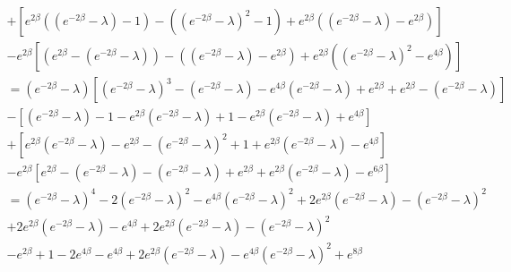 \documentclass[fleqn]{article}
\begin{document}
\begin{eqnarray}
 + \left[ e^{2 \beta} \left( (e^{-2 \beta} - \lambda) - 1 \right) - \left( (e^{-2 \beta} - \lambda)^2 -1 \right) + e^{2 \beta} \left( (e^{-2 \beta} - \lambda) - e^{2 \beta} \right) \right] \\
- e^{2 \beta} \left[ \left( e^{2 \beta} - (e^{-2 \beta} - \lambda) \right) - \left( (e^{-2 \beta} - \lambda) - e^{2 \beta} \right) + e^{2 \beta} \left( (e^{-2 \beta} - \lambda)^2 - e^{4 \beta} \right) \right] \\
= (e^{-2 \beta} - \lambda) \left[ (e^{-2 \beta} - \lambda)^3 - (e^{-2 \beta} - \lambda) - e^{4 \beta} (e^{-2 \beta} - \lambda) + e^{2 \beta} + e^{2 \beta} - (e^{-2 \beta} - \lambda) \right] \\
- \left[ (e^{-2 \beta} - \lambda) -1 -e^{2 \beta} (e^{-2 \beta} - \lambda) +1 - e^{2 \beta} (e^{-2 \beta} - \lambda) + e^{4 \beta} \right] \\
+ \left[ e^{2 \beta} (e^{-2 \beta} - \lambda) - e^{2 \beta} - (e^{-2 \beta} - \lambda)^2 + 1 + e^{2 \beta} (e^{-2 \beta} - \lambda) - e^{4 \beta} \right] \\
- e^{2 \beta} \left[ e^{2 \beta} - (e^{-2 \beta} - \lambda) - (e^{-2 \beta} - \lambda) + e^{2 \beta} + e^{2 \beta} (e^{-2 \beta} - \lambda) - e^{6 \beta} \right] \\
= (e^{-2 \beta} - \lambda)^4 - 2 (e^{-2 \beta} - \lambda)^2 - e^{4 \beta}(e^{-2 \beta} - \lambda)^2 + 2 e^{2 \beta} (e^{-2 \beta} - \lambda) - (e^{-2 \beta} - \lambda)^2 \\
 + 2 e^{2 \beta} (e^{-2 \beta} - \lambda) - e^{4 \beta} + 2 e^{2 \beta} (e^{-2 \beta} - \lambda) - (e^{-2 \beta} - \lambda)^2 \\
-e^{2 \beta} +1 -2 e^{4 \beta} - e^{4 \beta} + 2 e^{2 \beta} (e^{-2 \beta} - \lambda) - e^{4 \beta} (e^{-2 \beta} - \lambda)^2 + e^{8 \beta}
\end{eqnarray}
\end{document}
